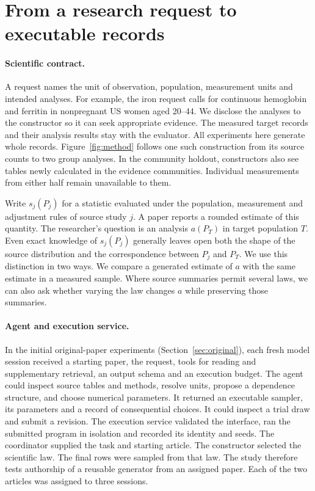 \documentclass[sigconf,anonymous,review]{acmart}
\begin{document}
\section{From a research request to executable records}
\label{sec:method}



\paragraph{Scientific contract.}
A request names the unit of observation, population, measurement units and intended analyses. For example, the iron request calls for continuous hemoglobin and ferritin in nonpregnant US women aged 20--44. We disclose the analyses to the constructor so it can seek appropriate evidence. The measured target records and their analysis results stay with the evaluator. All experiments here generate whole records. Figure~\ref{fig:method} follows one such construction from its source counts to two group analyses. In the community holdout, constructors also see tables newly calculated in the evidence communities. Individual measurements from either half remain unavailable to them.

Write $s_j(P_j)$ for a statistic evaluated under the population, measurement and adjustment rules of source study $j$. A paper reports a rounded estimate of this quantity. The researcher's question is an analysis $a(P_T)$ in target population $T$. Even exact knowledge of $s_j(P_j)$ generally leaves open both the shape of the source distribution and the correspondence between $P_j$ and $P_T$. We use this distinction in two ways. We compare a generated estimate of $a$ with the same estimate in a measured sample. Where source summaries permit several laws, we can also ask whether varying the law changes $a$ while preserving those summaries.

\paragraph{Agent and execution service.}
In the initial original-paper experiments (Section~\ref{sec:original}), each fresh model session received a starting paper, the request, tools for reading and supplementary retrieval, an output schema and an execution budget. The agent could inspect source tables and methods, resolve units, propose a dependence structure, and choose numerical parameters. It returned an executable sampler, its parameters and a record of consequential choices. It could inspect a trial draw and submit a revision. The execution service validated the interface, ran the submitted program in isolation and recorded its identity and seeds. The coordinator supplied the task and starting article. The constructor selected the scientific law. The final rows were sampled from that law. The study therefore tests authorship of a reusable generator from an assigned paper. Each of the two articles was assigned to three sessions.
\end{document}
